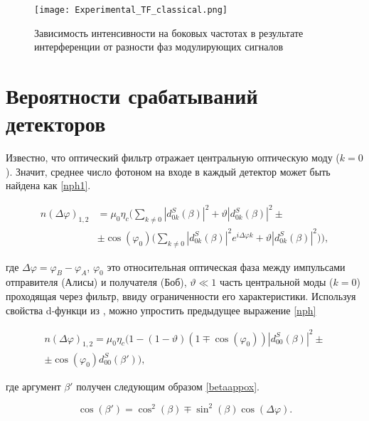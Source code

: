  \begin{figure}[ht]
  \centering
  \texttt{[image: Experimental\_TF\_classical.png]}
  \caption{Зависимость интенсивности на боковых частотах в результате интерференции от разности фаз модулирующих сигналов}
  \label{fig:Experimental_TF_classical}
\end{figure}

\pagebreak





\section{Вероятности срабатываний детекторов} \label{ch:ch5/sec5}

 Известно, что оптический фильтр отражает центральную оптическую моду ($k=0$). Значит, среднее число фотоном на входе в каждый детектор может быть найдена как \ref{nph1}. 
 
\begin{align}\label{nph1}
    n(\Delta\varphi)_{1,2}&=\mu_0\eta_c\Bigg(\sum_{k\neq 0}|d_{0k}^{S}(\beta)|^2 + \vartheta|d_{0k}^{S}(\beta)|^2 \pm \nonumber \\
    &\pm \cos(\varphi_0)\Big(\sum_{k\neq 0}|d_{0k}^{S}(\beta)|^2e^{i\Delta\varphi k}+ \vartheta|d_{0k}^{S}(\beta)|^2 \Big) \Bigg),
\end{align}

где $\Delta\varphi=\varphi_B-\varphi_A$, $\varphi_0$ это относительная оптическая фаза между импульсами отправителя (Алисы) и получателя (Боб), $\vartheta \ll 1$ часть центральной моды ($k=0$) проходящая через фильтр, ввиду ограниченности его характеристики. Используя свойства d-функци из \cite{varshalovich1988quantum}, можно упростить предыдущее выражение \ref{nph}

\begin{align}
    n(\Delta\varphi)_{1,2}=\mu_0\eta_c\Big(1-(1-\vartheta)(1\mp\cos(\varphi_0))|d_{00}^{S}(\beta)|^2 \pm \nonumber \\
    \pm\cos(\varphi_0)d_{00}^{S}(\beta')\Big) \label{nph},
\end{align}

где аргумент $\beta'$ получен следующим образом \ref{betaappox}. 

\begin{equation} \label{betaappox}
    \cos(\beta')=\cos^2(\beta) \mp \sin^2(\beta)\cos(\Delta\varphi).
\end{equation}

